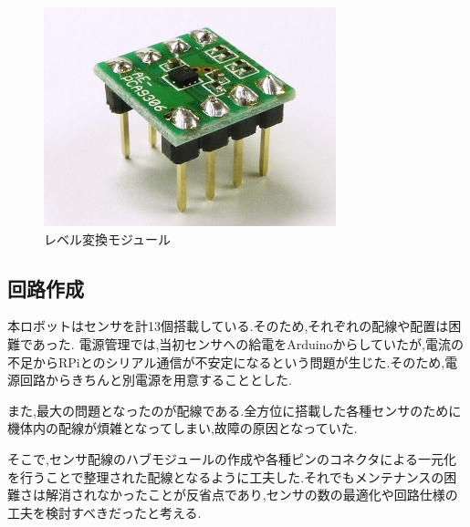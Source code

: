 \documentclass[10pt,a4j]{ujarticle}
\begin{document}
\begin{figure}[b]
 \centering
 \includegraphics[width=0.4\hsize]{./picture/level.png}
    \caption{レベル変換モジュール}
    \label{level}
\end{figure}
\newpage
\subsection{回路作成}
本ロボットはセンサを計13個搭載している.そのため,それぞれの配線や配置は困難であった.
電源管理では,当初センサへの給電をArduinoからしていたが,電流の不足からRPiとのシリアル通信が不安定になるという問題が生じた.そのため,電源回路からきちんと別電源を用意することとした.

また,最大の問題となったのが配線である.全方位に搭載した各種センサのために機体内の配線が煩雑となってしまい,故障の原因となっていた.

そこで,センサ配線のハブモジュールの作成や各種ピンのコネクタによる一元化を行うことで整理された配線となるように工夫した.それでもメンテナンスの困難さは解消されなかったことが反省点であり,センサの数の最適化や回路仕様の工夫を検討すべきだったと考える.
\end{document}
